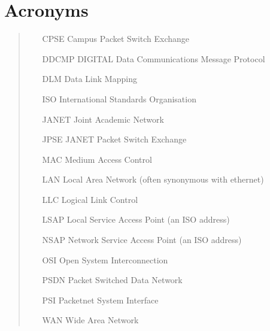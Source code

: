 \section{Acronyms}
\begin{quote}
\begin{itemize}
\item[CPSE] Campus Packet Switch Exchange
\item[DDCMP] DIGITAL Data Communications Message Protocol
\item[DLM] Data Link Mapping
\item[ISO] International Standards Organisation
\item[JANET] Joint Academic Network
\item[JPSE] JANET Packet Switch Exchange
\item[MAC] Medium Access Control
\item[LAN] Local Area Network (often synonymous with ethernet)
\item[LLC] Logical Link Control
\item[LSAP] Local Service Access Point (an ISO address)
\item[NSAP] Network Service Access Point (an ISO address)
\item[OSI] Open System Interconnection
\item[PSDN] Packet Switched Data Network
\item[PSI] Packetnet System Interface
\item[WAN] Wide Area Network
\end{itemize}
\end{quote}


